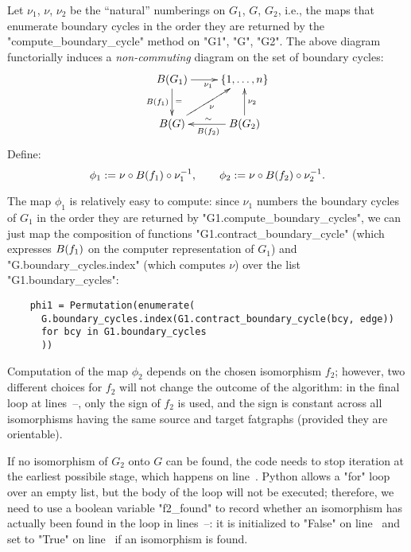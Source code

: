 Let $\nu_1$, $\nu$, $\nu_2$ be the ``natural'' numberings on $G_1$,
$G$, $G_2$, i.e., the maps that enumerate boundary cycles in the order
they are returned by the "compute_boundary_cycle" method on "G1", "G",
"G2".  The above diagram functorially induces a \emph{non-commuting}
diagram on the set of boundary cycles:
\begin{equation*}
  \xymatrix{
    \Holes{G_1} & \{1, \ldots, n\}
    \\
    \Holes{G}   &  \Holes{G_2}
    \ar_{\Holes{f_1}}^{=} "1,1";"2,1"
    \ar^{\Holes{f_2}}_{\sim} "2,2";"2,1"
    \ar_{\nu_1} "1,1";"1,2"
    \ar_{\nu} "2,1";"1,2"
    \ar_{\nu_2} "2,2";"1,2"
  }
\end{equation*}
Define:
\begin{equation}
  \label{eq:phi-maps}
  \phi_1 := \nu \circ B(f_1) \circ \nu_1^{-1},
  \qquad
  \phi_2 := \nu \circ B(f_2) \circ \nu_2^{-1}.
\end{equation}

The map $\phi_1$ is relatively easy to compute: since $\nu_1$ numbers
the boundary cycles of $G_1$ in the order they are returned by
"G1.compute_boundary_cycles", we can just map the composition of
functions "G1.contract_boundary_cycle" (which expresses $B(f_1)$ on
the computer representation of $G_1$) and "G.boundary_cycles.index"
(which computes $\nu$) over the list "G1.boundary_cycles":
\begin{lstlisting}
    phi1 = Permutation(enumerate(
      G.boundary_cycles.index(G1.contract_boundary_cycle(bcy, edge))
      for bcy in G1.boundary_cycles
      ))

\end{lstlisting}
 
Computation of the map $\phi_2$ depends on the chosen isomorphism
$f_2$; however, two different choices for $f_2$ will not change the
outcome of the algorithm: in the final loop at lines~--,
only the sign of $f_2$ is used, and the sign is constant across all
isomorphisms having the same source and target fatgraphs (provided
they are orientable).

If no isomorphism of $G_2$ onto $G$ can be found, the code needs to
stop iteration at the earliest possibile stage, which happens on
line~.  Python allows a "for" loop over an empty list, but
the body of the loop will not be executed; therefore, we need to use a
boolean variable "f2_found" to record whether an isomorphism has
actually been found in the loop in lines~--: it is
initialized to "False" on line~ and set to "True" on
line~ if an isomorphism is found.

